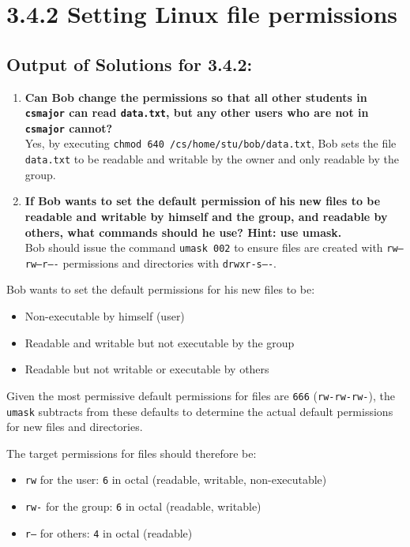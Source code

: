 \documentclass{article}
\begin{document}
\section*{3.4.2 Setting Linux file permissions}

\subsection*{Output of Solutions for 3.4.2:}


\begin{enumerate}
    \item \textbf{Can Bob change the permissions so that all other students in \texttt{csmajor} can read \texttt{data.txt}, but any other users who are not in \texttt{csmajor} cannot?}\\
    Yes, by executing \texttt{chmod 640 /cs/home/stu/bob/data.txt}, Bob sets the file \texttt{data.txt} to be readable and writable by the owner and only readable by the group.
    
    \item \textbf{If Bob wants to set the default permission of his new files to be readable and writable by himself and the group, and readable by others, what commands should he use? Hint: use umask.}\\
    Bob should issue the command \texttt{umask 002} to ensure files are created with \texttt{rw--rw--r----} permissions and directories with \texttt{drwxr-s----}.
\end{enumerate}

Bob wants to set the default permissions for his new files to be:

\begin{itemize}
    \item Non-executable by himself (user)
    \item Readable and writable but not executable by the group
    \item Readable but not writable or executable by others
\end{itemize}

Given the most permissive default permissions for files are \texttt{666} (\texttt{rw-rw-rw-}), the \texttt{umask} subtracts from these defaults to determine the actual default permissions for new files and directories.

The target permissions for files should therefore be:

\begin{itemize}
    \item \texttt{rw} for the user: \texttt{6} in octal (readable, writable, non-executable)
    \item \texttt{rw-} for the group: \texttt{6} in octal (readable, writable)
    \item \texttt{r--} for others: \texttt{4} in octal (readable)
\end{itemize}
\end{document}
